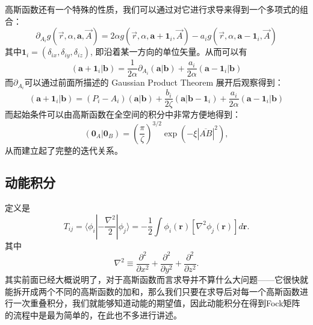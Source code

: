 \documentclass[12pt,a4paper,openany,twoside]{book}
\numberwithin{equation}{section}
\begin{document}
          高斯函数还有一个特殊的性质，我们可以通过对它进行求导来得到一个多项式的组合：
          \begin{equation}
              \partial_{A_i} g(\vec{r},\alpha,\boldsymbol{a},\vec{A}) = 2 \alpha g(\vec{r},\alpha,\boldsymbol{a} + \boldsymbol{1}_i,\vec{A}) - a_i g(\vec{r},\alpha,\boldsymbol{a} - \boldsymbol{1}_i,\vec{A})
          \end{equation}
          其中$\boldsymbol{1}_i = (\delta_{ix},\delta_{iy},\delta_{iz})$, 即沿着某一方向的单位矢量。从而可以有
          \begin{equation}
              (\boldsymbol{a}+\boldsymbol{1}_i|\boldsymbol{b}) = \frac{1}{2\alpha} \partial_{A_i} (\boldsymbol{a}|\boldsymbol{b}) + \frac{a_i}{2\alpha} (\boldsymbol{a}-\boldsymbol{1}_i|\boldsymbol{b})
          \end{equation}
          而$\partial_{A_i}$可以通过前面所描述的 Gaussian Product Theorem 展开后观察得到：
          \begin{equation}
              (\boldsymbol{a}+\boldsymbol{1}_i|\boldsymbol{b}) = (P_i - A_i)(\boldsymbol{a}|\boldsymbol{b}) +  \frac{b_i}{2\zeta} (\boldsymbol{a}|\boldsymbol{b}-\boldsymbol{1}_i) + \frac{a_i}{2\alpha} (\boldsymbol{a}-\boldsymbol{1}_i|\boldsymbol{b})
          \end{equation}
          而起始条件可以由高斯函数在全空间的积分中非常方便地得到：
          \begin{equation}
              (\boldsymbol{0}_A|\boldsymbol{0}_B) = \left(\frac{\pi}{\zeta}\right)^{3/2} \exp(- \xi |\overline{AB}|^2),
          \end{equation}
          从而建立起了完整的迭代关系。

        \subsection{动能积分}
          定义是
          \begin{equation}
              T_{ij} = \langle \phi_i | - \frac{\nabla ^ 2}{2} | \phi_j \rangle = -\frac{1}{2}\int \phi_i(\boldsymbol{r})[ \nabla^2 \phi_j(\boldsymbol{r}) ]d \boldsymbol{r}.
          \end{equation}
          其中
          \begin{equation}
              \nabla^2 \equiv \frac{\partial^2}{\partial x^2} + \frac{\partial^2}{\partial y^2} + \frac{\partial^2}{\partial z^2}.
          \end{equation}
          其实前面已经大概说明了，对于高斯函数而言求导并不算什么大问题——它很快就能拆开成两个不同的高斯函数的加和，那么我们只要在求导后对每一个高斯函数进行一次重叠积分，我们就能够知道动能的期望值，因此动能积分在得到Fock矩阵的流程中是最为简单的，在此也不多进行讲述。
\end{document}
